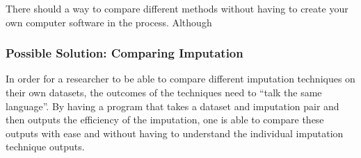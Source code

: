\documentclass{IEEEconf}
\begin{document}
			There should a way to compare different methods without having to create your own computer software in the process. Although 
			\subsubsection{Possible Solution: Comparing Imputation} %
			\label{sub:possible_solution}
				In order for a researcher to be able to compare different imputation techniques on their own datasets, the outcomes of the techniques need to ``talk the same language''. By having a program that takes a dataset and imputation pair and then outputs the efficiency of the imputation, one is able to compare these outputs with ease and without having to understand the individual imputation technique outputs. 
\end{document}

